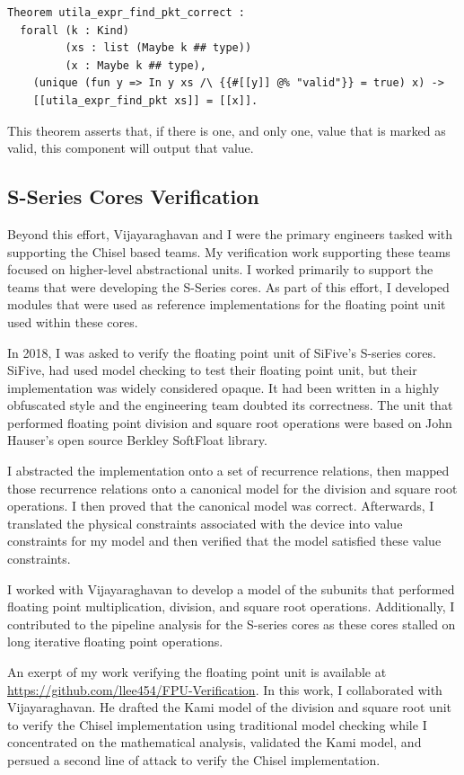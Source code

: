 \documentclass[10pt,a4paper]{article}
\begin{document}
\begin{verbatim}
Theorem utila_expr_find_pkt_correct :
  forall (k : Kind)
         (xs : list (Maybe k ## type))
         (x : Maybe k ## type),
    (unique (fun y => In y xs /\ {{#[[y]] @% "valid"}} = true) x) ->
    [[utila_expr_find_pkt xs]] = [[x]].
\end{verbatim}

This theorem asserts that, if there is one, and only one, value that is marked as valid, this component will output that value.

\subsection{S-Series Cores Verification}

Beyond this effort, Vijayaraghavan and I were the primary engineers tasked with supporting the Chisel based teams. My verification work supporting these teams focused on higher-level abstractional units. I worked primarily to support the teams that were developing the S-Series cores. As part of this effort, I developed modules that were used as reference implementations for the floating point unit used within these cores.

In 2018, I was asked to verify the floating point unit of SiFive’s S-series cores. SiFive, had used model checking to test their floating point unit, but their implementation was widely considered opaque. It had been written in a highly obfuscated style and the engineering team doubted its correctness. The unit that performed floating point division and square root operations were based on John Hauser's open source Berkley SoftFloat library.

I abstracted the implementation onto a set of recurrence relations, then mapped those recurrence relations onto a canonical model for the division and square root operations. I then proved that the canonical model was correct. Afterwards, I translated the physical constraints associated with the device into value constraints for my model and then verified that the model satisfied these value constraints.

I worked with Vijayaraghavan to develop a model of the subunits that performed floating point multiplication, division, and square root operations. Additionally, I contributed to the pipeline analysis for the S-series cores as these cores stalled on long iterative floating point operations. 

An exerpt of my work verifying the floating point unit is available at \url{https://github.com/llee454/FPU-Verification}. In this work, I collaborated with Vijayaraghavan. He drafted the Kami model of the division and square root unit to verify the Chisel implementation using traditional model checking while I concentrated on the mathematical analysis, validated the Kami model, and persued a second line of attack to verify the Chisel implementation.
\end{document}
